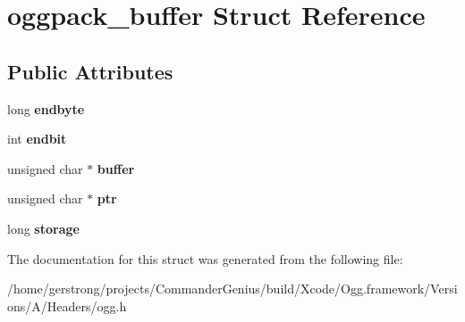 \hypertarget{structoggpack__buffer}{
\section{oggpack\_\-buffer Struct Reference}
\label{structoggpack__buffer}
}
\subsection*{Public Attributes}
\begin{DoxyCompactItemize}
\item 
\hypertarget{structoggpack__buffer_a416200dd77da3603dce3913826d74207}{
long {\bfseries endbyte}}
\label{structoggpack__buffer_a416200dd77da3603dce3913826d74207}

\item 
\hypertarget{structoggpack__buffer_a5a2ecb260025f73201e58dbd621c9f8b}{
int {\bfseries endbit}}
\label{structoggpack__buffer_a5a2ecb260025f73201e58dbd621c9f8b}

\item 
\hypertarget{structoggpack__buffer_a2d828a6e3d0a57f44debf56665ad402e}{
unsigned char $\ast$ {\bfseries buffer}}
\label{structoggpack__buffer_a2d828a6e3d0a57f44debf56665ad402e}

\item 
\hypertarget{structoggpack__buffer_a479984d9646e0fba6da8aff21e5c3b64}{
unsigned char $\ast$ {\bfseries ptr}}
\label{structoggpack__buffer_a479984d9646e0fba6da8aff21e5c3b64}

\item 
\hypertarget{structoggpack__buffer_a1eea2afb662c8080a902d224773fee4e}{
long {\bfseries storage}}
\label{structoggpack__buffer_a1eea2afb662c8080a902d224773fee4e}

\end{DoxyCompactItemize}


The documentation for this struct was generated from the following file:\begin{DoxyCompactItemize}
\item 
/home/gerstrong/projects/CommanderGenius/build/Xcode/Ogg.framework/Versions/A/Headers/ogg.h\end{DoxyCompactItemize}
